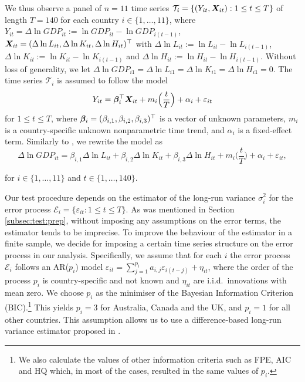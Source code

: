 \documentclass[a4paper,12pt]{article}
\makeatletter
\renewcommand{\eqref}[1]{\tagform@{\ref{#1}}}
\makeatother
\begin{document}
We thus observe a panel of $n = 11$ time series $\mathcal{T}_i = \{(Y_{it}, \boldsymbol{X}_{it}): 1 \le t \le T \}$ of length $T = 140$ for each country $i \in \{1,\ldots, 11\}$, where $Y_{it} = \Delta \ln GDP_{it} := \ln GDP_{it} - \ln GDP_{i(t-1)}$, $\boldsymbol{X}_{it} = (\Delta \ln L_{it}, \Delta \ln K_{it}, \Delta \ln H_{it})^\top$ with $\Delta \ln L_{it} := \ln L_{it} - \ln L_{i(t-1)}$, $\Delta \ln K_{it} := \ln K_{it} - \ln K_{i(t-1)}$ and $\Delta \ln H_{it} := \ln H_{it} - \ln H_{i(t-1)}$. Without loss of generality, we let $\Delta \ln GDP_{i1} = \Delta \ln L_{i1} = \Delta \ln K_{i1} = \Delta \ln H_{i1} = 0$. The time series $\mathcal{T}_i$ is assumed to follow the model 
\begin{equation}\label{eq:model:app}
Y_{it} = \bm{\beta}^\top_i \boldsymbol{X}_{it} + m_i \Big( \frac{t}{T} \Big) + \alpha_i + \varepsilon_{it} 
\end{equation}
for $1 \le t \le T$, where $\bm{\beta}_i = (\beta_{i, 1}, \beta_{i, 2}, \beta_{i, 3})^\top$ is a vector of unknown parameters, $m_i$ is a country-specific unknown nonparametric time trend, and $\alpha_i$ is a fixed-effect term. Similarly to \cite{Zhang2012}, we rewrite the model \eqref{eq:model:app} as
\begin{equation}\label{eq:model:app2}
\Delta \ln GDP_{it} = \beta_{i, 1} \Delta \ln L_{it} + \beta_{i, 2} \Delta \ln K_{it} + \beta_{i, 3} \Delta \ln H_{it} + m_i \Big( \frac{t}{T} \Big) + \alpha_i + \varepsilon_{it},
\end{equation}

for $i \in \{1, \ldots, 11\}$ and $t \in \{1, \ldots, 140\}$.

Our test procedure depends on the estimator of the long-run variance $\sigma_i^2$ for the error process $\mathcal{E}_i = \{\varepsilon_{it}: 1 \le t \le T\}$. As was mentioned in Section \ref{subsec:test:prep}, without imposing any assumptions on the error terms, the estimator tends to be imprecise. To improve the behaviour of the estimator in a finite sample, we decide for imposing a certain time series structure on the error process in our analysis. Specifically, we assume that for each $i$ the error process $\mathcal{E}_i$ follows an AR($p_i$) model $\varepsilon_{it} = \sum_{j=1}^{p_i} a_{i, j} \varepsilon_{i(t-j)} + \eta_{it}$, where the order of the process $p_i$ is country-specific and not known and $\eta_{it}$ are i.i.d.\ innovations with mean zero. We choose $p_i$ as the minimiser of the Bayesian Information Criterion (BIC).\footnote{We also calculate the values of other information criteria such as FPE, AIC and HQ which, in most of the cases, resulted in the same values of $p_i$.} This yields $p_i = 3$ for Australia, Canada and the UK, and $p_i = 1$ for all other countries. This assumption allows us to use a difference-based long-run variance estimator proposed in \cite{KhismatullinaVogt2020}.%
\end{document}
